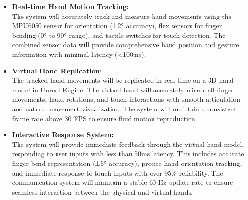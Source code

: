 

\begin{itemize}
    \item \textbf{Real-time Hand Motion Tracking:} \\
    The system will accurately track and measure hand movements using the MPU6050 sensor for orientation (±2° accuracy), flex sensors for finger bending (0° to 90° range), and tactile switches for touch detection. The combined sensor data will provide comprehensive hand position and gesture information with minimal latency (<100ms).

    \item \textbf{Virtual Hand Replication:} \\
    The tracked hand movements will be replicated in real-time on a 3D hand model in Unreal Engine. The virtual hand will accurately mirror all finger movements, hand rotations, and touch interactions with smooth articulation and natural movement visualization. The system will maintain a consistent frame rate above 30 FPS to ensure fluid motion reproduction.

    \item \textbf{Interactive Response System:} \\
    The system will provide immediate feedback through the virtual hand model, responding to user inputs with less than 50ms latency. This includes accurate finger bend representation (±5° accuracy), precise hand orientation tracking, and immediate response to touch inputs with over 95\% reliability. The communication system will maintain a stable 60 Hz update rate to ensure seamless interaction between the physical and virtual hands.
\end{itemize}